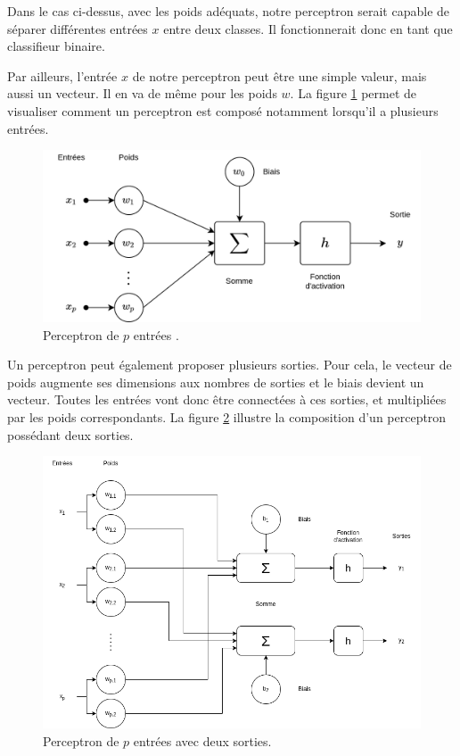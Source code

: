 Dans le cas ci-dessus, avec les poids adéquats, notre perceptron serait capable de séparer différentes entrées $x$ entre deux classes. Il fonctionnerait donc en tant que classifieur binaire.

Par ailleurs, l'entrée $x$ de notre perceptron peut être une simple valeur, mais aussi un vecteur. Il en va de même pour les poids $w$. La figure \ref{fig:neurone_formel} permet de visualiser comment un perceptron est composé notamment lorsqu'il a plusieurs entrées.

\begin{figure}[htb!]
    \centering
    \includegraphics[scale=0.30]{Figures/neurone_formel_representation.png}
    \caption{Perceptron de $p$ entrées \cite{noauthor_perceptron_3png_nodate}.}
    \label{fig:neurone_formel}
\end{figure}

\pagebreak

Un perceptron peut également proposer plusieurs sorties. Pour cela, le vecteur de poids augmente ses dimensions aux nombres de sorties et le biais devient un vecteur. Toutes les entrées vont donc être connectées à ces sorties, et multipliées par les poids correspondants. La figure \ref{fig:perceptron_multi_output} illustre la composition d'un perceptron possédant deux sorties. 

\begin{figure}[hbt!]
    \centering
    \includegraphics[scale=0.50]{Figures/perceptron_multi_sortie.png}
    \caption{Perceptron de $p$ entrées avec deux sorties.}
    \label{fig:perceptron_multi_output}
\end{figure}

